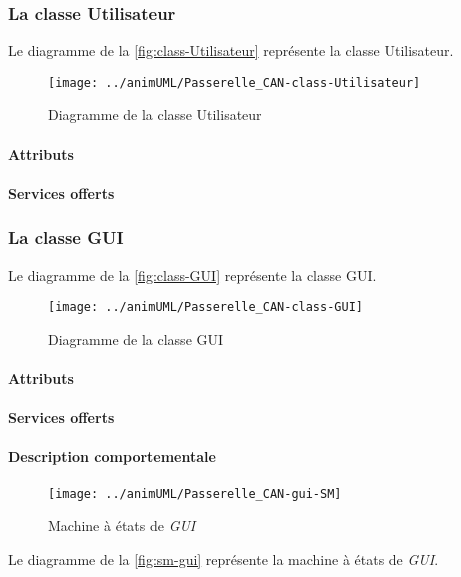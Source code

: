 \subsubsection{La classe Utilisateur}

Le diagramme de la \autoref{fig:class-Utilisateur} représente la classe Utilisateur.
\begin{figure}[H]
	\centering
	\texttt{[image: ../animUML/Passerelle\_CAN-class-Utilisateur]}
	\caption{Diagramme de la classe Utilisateur}
	\label{fig:class-Utilisateur}
\end{figure}


\paragraph{Attributs}
\classUtilisateurProperties
\paragraph{Services offerts}
\classUtilisateurOperations
\subsubsection{La classe GUI}

Le diagramme de la \autoref{fig:class-GUI} représente la classe GUI.
\begin{figure}[H]
	\centering
	\texttt{[image: ../animUML/Passerelle\_CAN-class-GUI]}
	\caption{Diagramme de la classe GUI}
	\label{fig:class-GUI}
\end{figure}


\paragraph{Attributs}
\classGUIProperties
\paragraph{Services offerts}
\classGUIOperations
\paragraph{Description comportementale}
\begin{figure}[H]
	\centering
	\texttt{[image: ../animUML/Passerelle\_CAN-gui-SM]}
	\caption{Machine à états de \emph{GUI}}
	\label{fig:sm-gui}
\end{figure}
Le diagramme de la \autoref{fig:sm-gui} représente la machine à états de \emph{GUI}.

